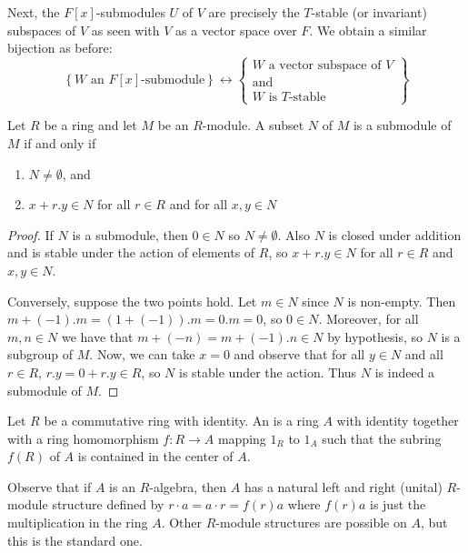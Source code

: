 \documentclass[12pt, a4paper, oneside, openright, titlepage]{book}
\begin{document}
\begin{eg}[(F{[x]}-modules)]
    Next, the $F[x]$-submodules $U$ of $V$ are precisely the $T$-stable (or invariant) subspaces of $V$ as seen with $V$ as a vector space over $F$. We obtain a similar bijection as before: \begin{equation*}
        \left\{W\text{ an }F[x]\text{-submodule}\right\} \leftrightarrow \left\{\begin{array}{c} W\text{ a vector subspace of } V \\ \text{and} \\ W\text{ is $T$-stable}\end{array}\right\}
    \end{equation*}
\end{eg}


\begin{prop}
    Let $R$ be a ring and let $M$ be an $R$-module. A subset $N$ of $M$ is a submodule of $M$ if and only if \begin{enumerate}
        \item $N \neq \emptyset$, and 
        \item $x+r.y \in N$ for all $r \in R$ and for all $x,y \in N$
    \end{enumerate}
\end{prop}
\begin{proof}
    If $N$ is a submodule, then $0 \in N$ so $N \neq \emptyset$. Also $N$ is closed under addition and is stable under the action of elements of $R$, so $x+r.y \in N$ for all $r \in R$ and $x,y \in N$.

    Conversely, suppose the two points hold. Let $m \in N$ since $N$ is non-empty. Then $m+(-1).m = (1+(-1)).m = 0.m = 0$, so $0 \in N$. Moreover, for all $m,n \in N$ we have that $m+(-n) = m+(-1).n \in N$ by hypothesis, so $N$ is a subgroup of $M$. Now, we can take $x = 0$ and observe that for all $y \in N$ and all $r \in R$, $r.y = 0+r.y \in R$, so $N$ is stable under the action. Thus $N$ is indeed a submodule of $M$.
\end{proof}


\begin{defn}
    Let $R$ be a commutative ring with identity. An  is a ring $A$ with identity together with a ring homomorphism $f:R\rightarrow A$ mapping $1_R$ to $1_A$ such that the subring $f(R)$ of $A$ is contained in the center of $A$.
\end{defn}

Observe that if $A$ is an $R$-algebra, then $A$ has a natural left and right (unital) $R$-module structure defined by $r\cdot a = a\cdot r = f(r)a$ where $f(r)a$ is just the multiplication in the ring $A$. Other $R$-module structures are possible on $A$, but this is the standard one.
\end{document}
